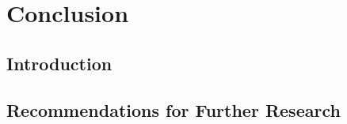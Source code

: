 \chapter{Conclusion} 
\label{Chapter5} 
\section{Introduction}

\section{Recommendations for Further Research}
